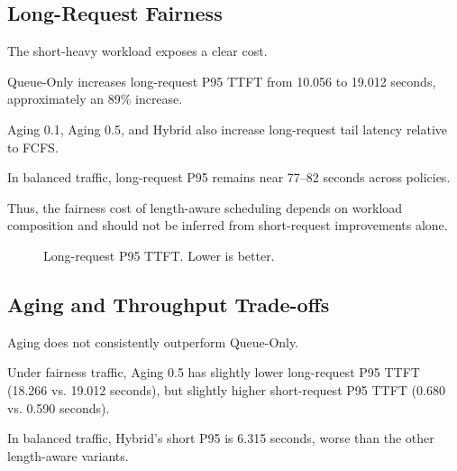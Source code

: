 \documentclass[sigplan,nonacm]{acmart}
\begin{document}
\subsection{Long-Request Fairness}

The short-heavy workload exposes a clear cost.

Queue-Only increases long-request P95 TTFT
from 10.056 to 19.012 seconds,
approximately an 89\% increase.

Aging 0.1, Aging 0.5, and Hybrid also increase
long-request tail latency relative to FCFS.

In balanced traffic, long-request P95
remains near 77--82 seconds across policies.

Thus, the fairness cost of length-aware
scheduling depends on workload composition
and should not be inferred from short-request
improvements alone.

\begin{figure}[t]
\centering
{}
\caption{
Long-request P95 TTFT.
Lower is better.
}
\label{fig:long}
\end{figure}

\subsection{Aging and Throughput Trade-offs}

Aging does not consistently outperform
Queue-Only.

Under fairness traffic, Aging 0.5 has slightly
lower long-request P95 TTFT
(18.266 vs. 19.012 seconds),
but slightly higher short-request P95 TTFT
(0.680 vs. 0.590 seconds).

In balanced traffic, Hybrid's short P95
is 6.315 seconds, worse than the other
length-aware variants.
\end{document}
